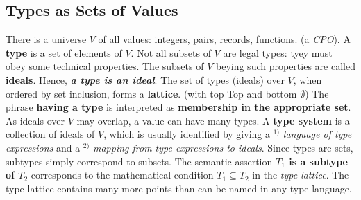 \documentclass{article}
\begin{document}
\subsection{Types as Sets of Values}
\bit
\w There is a universe $V$ of all values: integers, pairs, records, 
	functions. (a {\em{}CPO}).
\w A {\bf{}type} is a set of elements of $V$.
	\bit
	\w Not all subsets of $V$ are legal types: tyey must obey some
		technical properties.
	\w The subsets of $V$ beying such properties are called
		{\bf{}ideals}.
	\w Hence, {\sl\bfseries{}a type is an ideal}.
	\eit
\w The set of types (ideals) over $V$, when ordered by set inclusion,
	forms a {\bf{}lattice}. (with top {\sf{}Top} and bottom $\emptyset$)
	\bit
	\w The phrase {\bf{}having a type} is interpreted as {\bf{}membership
	in the appropriate set}.
	\w As ideals over $V$ may overlap, a value can have many types.
	\eit
\w A {\bf{}type system} is a collection of ideals of $V$, which is 
	usually identified by giving a $^{1)}$ 
	{\em{}language of type expressions\/} 
	and a 
	$^{2)}$ {\em{}mapping from type expressions to ideals\/}.
\w Since types are sets, subtypes simply correspond to subsets.
	\bit
	\w The semantic assertion {\bf{}$T_1$ is a  subtype of $T_2$}
		corresponds to the mathematical condition
		$T_1 \subseteq T_2$ in the {\em{}type lattice\/}.
	\eit
\w The type lattice contains many more points than can be named in any 
	type language.
	
\eit
\end{document}
